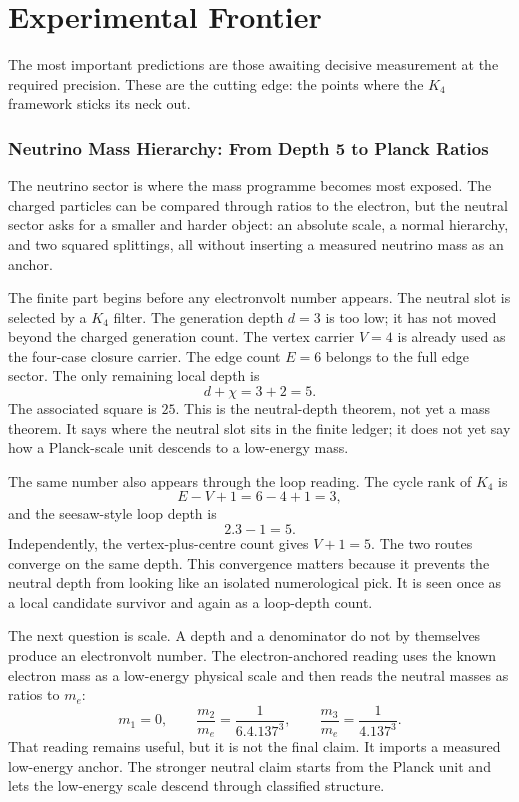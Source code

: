 \documentclass[11pt,a4paper]{book}
\def\cdot{.}%
\begin{document}
\section*{Experimental Frontier}

The most important predictions are those awaiting decisive measurement at the required precision. These are the cutting edge: the points where the $K_4$ framework sticks its neck out.

\subsubsection*{Neutrino Mass Hierarchy: From Depth 5 to Planck Ratios}

The neutrino sector is where the mass programme becomes most exposed.  The
charged particles can be compared through ratios to the electron, but the
neutral sector asks for a smaller and harder object: an absolute scale, a
normal hierarchy, and two squared splittings, all without inserting a measured
neutrino mass as an anchor.

The finite part begins before any electronvolt number appears.  The neutral
slot is selected by a $K_4$ filter.  The generation depth $d=3$ is too low;
it has not moved beyond the charged generation count.  The vertex carrier
$V=4$ is already used as the four-case closure carrier.  The edge count
$E=6$ belongs to the full edge sector.  The only remaining local depth is
\[
  d+\chi = 3+2 = 5.
\]
The associated square is $25$.  This is the neutral-depth theorem, not yet a
mass theorem.  It says where the neutral slot sits in the finite ledger; it
does not yet say how a Planck-scale unit descends to a low-energy mass.

The same number also appears through the loop reading.  The cycle rank of
$K_4$ is
\[
  E - V + 1 = 6 - 4 + 1 = 3,
\]
and the seesaw-style loop depth is
\[
  2\cdot 3 - 1 = 5.
\]
Independently, the vertex-plus-centre count gives $V+1=5$.  The two routes
converge on the same depth.  This convergence matters because it prevents
the neutral depth from looking like an isolated numerological pick.  It is
seen once as a local candidate survivor and again as a loop-depth count.

The next question is scale.  A depth and a denominator do not by themselves
produce an electronvolt number.  The electron-anchored reading uses the known
electron mass as a low-energy physical scale and then reads the neutral
masses as ratios to $m_e$:
\[
  m_1=0,\qquad
  \frac{m_2}{m_e}=\frac{1}{6\cdot4\cdot137^3},\qquad
  \frac{m_3}{m_e}=\frac{1}{4\cdot137^3}.
\]
That reading remains useful, but it is not the final claim.  It imports a
measured low-energy anchor.  The stronger neutral claim starts from the
Planck unit and lets the low-energy scale descend through classified
structure.
\end{document}
